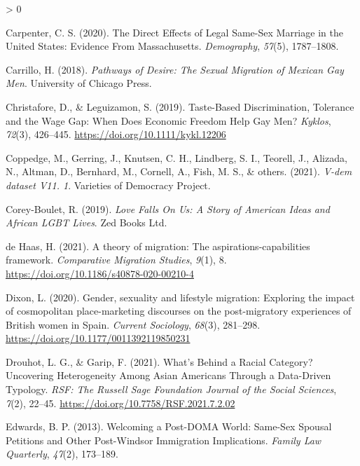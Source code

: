 \documentclass[
  11pt,
]{article}
\newlength{\cslhangindent}
\newenvironment{CSLReferences}[2] %
 {%
  \setlength{\parindent}{0pt}
  \ifodd #1 \everypar{\setlength{\hangindent}{\cslhangindent}}\ignorespaces\fi
  \ifnum #2 > 0
  \setlength{\parskip}{#2\baselineskip}
  \fi
 }%
 {}
\begin{document}
\begin{CSLReferences}{1}{0}
\leavevmode\hypertarget{ref-carpenter_2020}{}%
Carpenter, C. S. (2020). The {Direct Effects} of {Legal Same}-{Sex Marriage} in the {United States}: {Evidence From Massachusetts}. \emph{Demography}, \emph{57}(5), 1787--1808.

\leavevmode\hypertarget{ref-carrillo_2018}{}%
Carrillo, H. (2018). \emph{Pathways of {Desire}: {The Sexual Migration} of {Mexican Gay Men}}. {University of Chicago Press}.

\leavevmode\hypertarget{ref-christafore_2019}{}%
Christafore, D., \& Leguizamon, S. (2019). Taste-{Based Discrimination}, {Tolerance} and the {Wage Gap}: {When Does Economic Freedom Help Gay Men}? \emph{Kyklos}, \emph{72}(3), 426--445. \url{https://doi.org/10.1111/kykl.12206}

\leavevmode\hypertarget{ref-coppedge_2021}{}%
Coppedge, M., Gerring, J., Knutsen, C. H., Lindberg, S. I., Teorell, J., Alizada, N., Altman, D., Bernhard, M., Cornell, A., Fish, M. S., \& others. (2021). \emph{V-dem dataset V11. 1}. {Varieties of Democracy Project}.

\leavevmode\hypertarget{ref-corey-boulet_2019}{}%
Corey-Boulet, R. (2019). \emph{Love {Falls On Us}: {A Story} of {American Ideas} and {African LGBT Lives}}. {Zed Books Ltd.}

\leavevmode\hypertarget{ref-dehaas_2021}{}%
de Haas, H. (2021). A theory of migration: The aspirations-capabilities framework. \emph{Comparative Migration Studies}, \emph{9}(1), 8. \url{https://doi.org/10.1186/s40878-020-00210-4}

\leavevmode\hypertarget{ref-dixon_2020}{}%
Dixon, L. (2020). Gender, sexuality and lifestyle migration: {Exploring} the impact of cosmopolitan place-marketing discourses on the post-migratory experiences of {British} women in {Spain}. \emph{Current Sociology}, \emph{68}(3), 281--298. \url{https://doi.org/10.1177/0011392119850231}

\leavevmode\hypertarget{ref-drouhot_2021_what}{}%
Drouhot, L. G., \& Garip, F. (2021). What's {Behind} a {Racial Category}? {Uncovering Heterogeneity Among Asian Americans Through} a {Data}-{Driven Typology}. \emph{RSF: The Russell Sage Foundation Journal of the Social Sciences}, \emph{7}(2), 22--45. \url{https://doi.org/10.7758/RSF.2021.7.2.02}

\leavevmode\hypertarget{ref-edwards_2013}{}%
Edwards, B. P. (2013). Welcoming a {Post}-{DOMA World}: {Same}-{Sex Spousal Petitions} and {Other Post}-{Windsor Immigration Implications}. \emph{Family Law Quarterly}, \emph{47}(2), 173--189.


\end{CSLReferences}
\end{document}
